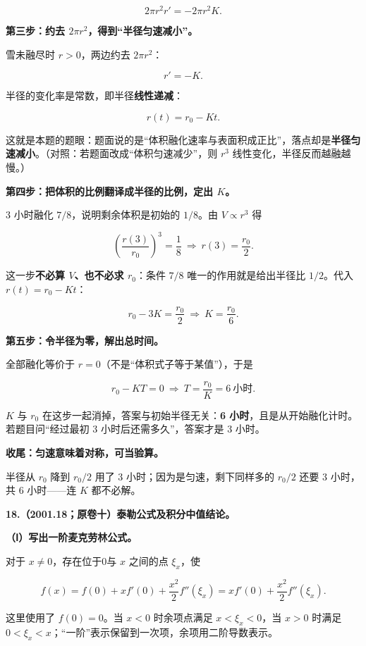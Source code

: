 \documentclass[UTF8,11pt,fontset=windows]{ctexart}
\begin{document}
$$
2\pi r^2r'=-2\pi r^2K.
$$

\textbf{第三步：约去 $2\pi r^2$，得到“半径匀速减小”。}

雪未融尽时 $r>0$，两边约去 $2\pi r^2$：

$$
r'=-K.
$$

半径的变化率是常数，即半径\textbf{线性递减}：

$$
r(t)=r_0-Kt.
$$

这就是本题的题眼：题面说的是“体积融化速率与表面积成正比”，落点却是\textbf{半径匀速减小}。（对照：若题面改成“体积匀速减少”，则 $r^3$ 线性变化，半径反而越融越慢。）

\textbf{第四步：把体积的比例翻译成半径的比例，定出 $K$。}

3 小时融化 $7/8$，说明剩余体积是初始的 $1/8$。由 $V\propto r^3$ 得

$$
\left(\frac{r(3)}{r_0}\right)^3=\frac18
\ \Longrightarrow\ r(3)=\frac{r_0}{2}.
$$

这一步\textbf{不必算 $V$、也不必求 $r_0$}：条件 $7/8$ 唯一的作用就是给出半径比 $1/2$。代入 $r(t)=r_0-Kt$：

$$
r_0-3K=\frac{r_0}{2}
\ \Longrightarrow\ K=\frac{r_0}{6}.
$$

\textbf{第五步：令半径为零，解出总时间。}

全部融化等价于 $r=0$（不是“体积式子等于某值”），于是

$$
r_0-KT=0
\ \Longrightarrow\ T=\frac{r_0}{K}=6\ \text{小时}.
$$

$K$ 与 $r_0$ 在这步一起消掉，答案与初始半径无关：\textbf{6 小时}，且是从开始融化计时。若题目问“经过最初 3 小时后还需多久”，答案才是 3 小时。

\textbf{收尾：匀速意味着对称，可当验算。}

半径从 $r_0$ 降到 $r_0/2$ 用了 3 小时；因为是匀速，剩下同样多的 $r_0/2$ 还要 3 小时，共 6 小时——连 $K$ 都不必解。

\clearpage

\textbf{18.（2001.18；原卷十）泰勒公式及积分中值结论。}

\textbf{（Ⅰ）写出一阶麦克劳林公式。}

对于 $x\ne0$，存在位于0与 $x$ 之间的点 $\xi_x$，使

$$
f(x)=f(0)+xf'(0)+\frac{x^2}{2}f''(\xi_x)
=xf'(0)+\frac{x^2}{2}f''(\xi_x).
$$

这里使用了 $f(0)=0$。当 $x<0$ 时余项点满足 $x<\xi_x<0$，当 $x>0$ 时满足 $0<\xi_x<x$；“一阶”表示保留到一次项，余项用二阶导数表示。
\end{document}
